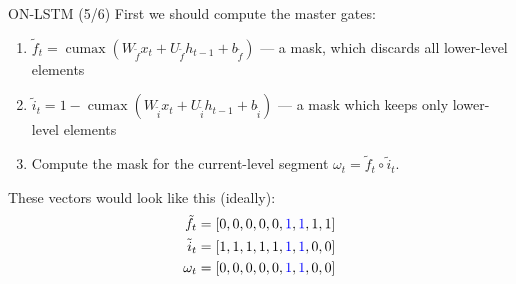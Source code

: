 \documentclass[handout, 10pt]{beamer}
\begin{document}
\begin{frame}{ON-LSTM (5/6)}
\pause First we should compute the master gates:
    \begin{enumerate}
        \item\pause $\tilde{f}_{t}=\operatorname{cumax}\left(W_{\tilde{f}} x_{t}+U_{\tilde{f}} h_{t-1}+b_{\tilde{f}}\right)$ --- a mask, which discards all lower-level elements
        \item\pause $\tilde{i}_{t}=1-\operatorname{cumax}\left(W_{\tilde{i}} x_{t}+U_{\tilde{i}} h_{t-1}+b_{\tilde{i}}\right)$ --- a mask which keeps only lower-level elements
        \item\pause Compute the mask for the current-level segment $\omega_{t} =\tilde{f}_{t} \circ \tilde{i}_{t}$.
    \end{enumerate}

These vectors would look like this (ideally):
\begin{equation}
\begin{aligned}
\tilde{f}_{t} &= [0, 0, 0, 0, 0, \textcolor{blue}{1}, \textcolor{blue}{1}, 1, 1] \\
\tilde{i}_{t} &= [1, 1, 1, 1, 1, \textcolor{blue}{1}, \textcolor{blue}{1}, 0, 0] \\
\omega_{t} &=    [0, 0, 0, 0, 0, \textcolor{blue}{1}, \textcolor{blue}{1}, 0, 0]
\end{aligned}
\end{equation}


\end{frame}
\end{document}
